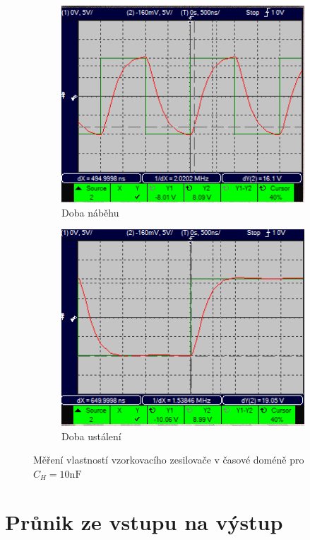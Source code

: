\documentclass[twoside]{article}
\begin{document}
\begin{figure}[h!]
    \centering
    \begin{subfigure}{0.45\textwidth}
        \centering
        \includegraphics[width=0.8\linewidth]{rise_time_10.png}
        \caption{Doba náběhu}
        \label{fig:rise_time}
    \end{subfigure}
    \begin{subfigure}{0.45\textwidth}
        \centering
        \includegraphics[width=0.8\linewidth]{settling_time_10.png}
        \caption{Doba ustálení}
        \label{fig:settling_time}
    \end{subfigure}
    \label{fig:doby}
    \caption{Měření vlastností vzorkovacího zesilovače v časové doméně pro $C_H = 10 \si{\nano\farad}$}
\end{figure}

\newpage

\section{Průnik ze vstupu na výstup}
\end{document}
